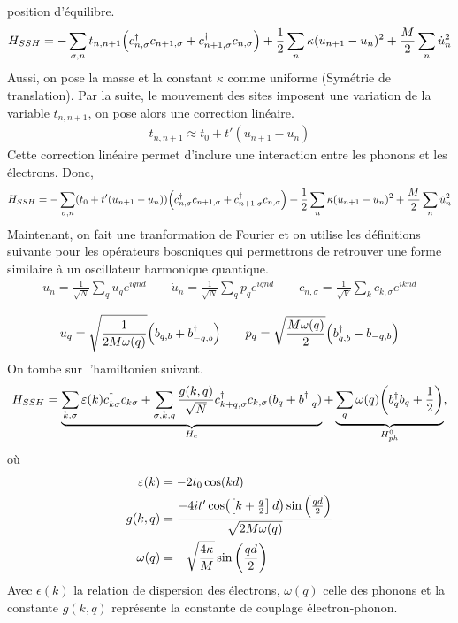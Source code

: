 position d'équilibre.
\begin{align}
    H_{SSH} = -\sum_{\sigma,n} t_{n,n+1} \qty(c^\dagger_{n,\sigma}c_{n+1,\sigma}
    + c^\dagger_{n+1,\sigma}c_{n,\sigma} ) + \frac{1}{2}\sum_{n}
    \kappa (u_{n+1}-u_n)^2 + \frac{M}{2}\sum_n \dot{u}^2_n
\end{align}
Aussi, on pose la masse et la constant $\kappa$ comme uniforme (Symétrie de
translation).  Par la suite, le mouvement des sites imposent une variation
de la variable $t_{n,n+1}$, on pose alors une correction linéaire.
\begin{align}
    t_{n,n+1} \approx t_0 + t'(u_{n+1} - u_n)
\end{align}
Cette correction linéaire permet d'inclure une interaction entre les phonons
et les électrons. Donc,
\begin{align}
    H_{SSH} = -\sum_{\sigma,n} (t_0 + t'(u_{n+1} - u_n))
    \qty(c^\dagger_{n,\sigma}c_{n+1,\sigma} + c^\dagger_{n+1,\sigma}
    c_{n,\sigma} )+ \frac{1}{2}\sum_{n} \kappa (u_{n+1}-u_n)^2
    + \frac{M}{2}\sum_n \dot{u}^2_n
\end{align}
Maintenant, on fait une tranformation de Fourier et on utilise les définitions
suivante pour les opérateurs bosoniques qui permettrons de retrouver une
forme similaire à un oscillateur harmonique quantique.
\begin{align*}
    u_{n} =  \frac{1}{\sqrt{N}}\sum_{q}u_q e^{iqnd}\qquad\dot{u}_{n} =
    \frac{1}{\sqrt{N}}\sum_{q}p_q e^{iqnd}\qquad  c_{n,\sigma} =
    \frac{1}{\sqrt{V}}\sum_k c_{k,\sigma} e^{iknd} \\
\end{align*}
\begin{align*}
    u_q = \sqrt{\frac{1}{2M\omega(q)}}\qty(b_{q,b}+b^\dagger_{-q,b})\qquad
    p_q =\sqrt{\frac{M\omega(q)}{2}}\qty(b_{q,b}^\dagger-b_{-q,b}) \\
\end{align*}
On tombe sur l'hamiltonien suivant.
\begin{align}
    H_{SSH} = \underbrace{\sum_{k,\sigma}\varepsilon(k)c_{k\sigma}^\dagger
    c_{k\sigma} + \sum_{\sigma,k,q}\frac{g(k,q)}{\sqrt{N}}
    c^\dagger_{k+q,\sigma}c_{k,\sigma}(b_q+b^\dagger_{-q})}_{H_e}
    + \underbrace{\sum_q\omega(q)\qty(b^\dagger_qb_q+\frac{1}{2})}_{H_{ph}^0},
\end{align}
où
\begin{align}
    \varepsilon(k) &= -2t_0\cos(kd)\\
    g(k,q) &= \frac{-4it'\cos(\left[k+\frac{q}{2}\right]d)\sin
    \qty(\frac{qd}{2})}{\sqrt{2M\omega(q)}} \\
    \omega(q) &= -\sqrt{\frac{4\kappa}{M}} \sin\qty(\frac{qd}{2})
\end{align}
Avec $\epsilon(k)$ la relation de dispersion des électrons, $\omega(q)$
celle des phonons et la constante $g(k,q)$ représente la constante de
couplage électron-phonon.

